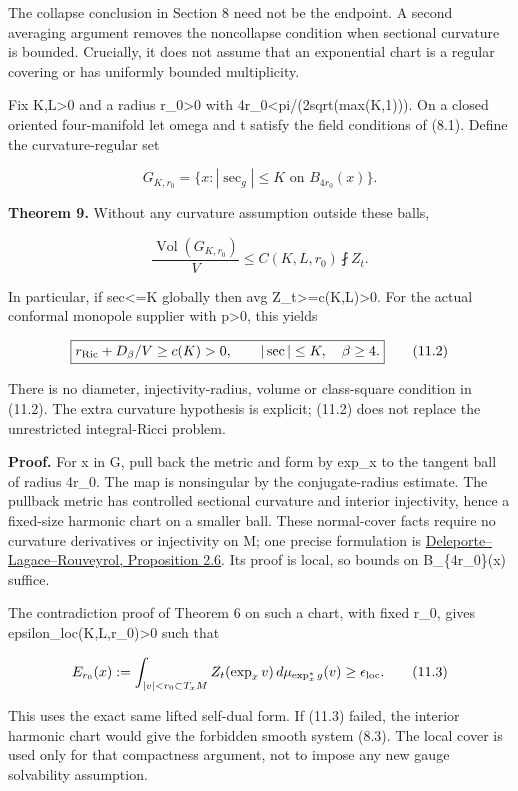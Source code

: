 \documentclass[
  10pt,
]{article}
\begin{document}
The collapse conclusion in Section 8 need not be the endpoint. A second
averaging argument removes the noncollapse condition when sectional
curvature is bounded. Crucially, it does not assume that an exponential
chart is a regular covering or has uniformly bounded multiplicity.

Fix K,L\textgreater0 and a radius r\_0\textgreater0 with
4r\_0\textless pi/(2sqrt(max(K,1))). On a closed oriented four-manifold
let omega and t satisfy the field conditions of (8.1). Define the
curvature-regular set

\[
 G_{K,r_0}=\{x: |\sec_g|\le K\text{ on }B_{4r_0}(x)\}.
\]

\textbf{Theorem 9.} Without any curvature assumption outside these
balls,

\[
 \boxed{\frac{\operatorname{Vol}(G_{K,r_0})}{V}
                   \le C(K,L,r_0)\fint Z_t.}           \tag{11.1}
\]

In particular, if \textbar sec\textbar\textless=K globally then avg
Z\_t\textgreater=c(K,L)\textgreater0. For the actual conformal monopole
supplier with p\textgreater0, this yields

\[
 \boxed{r_{\rm Ric}+D_\beta/V\ge c(K)>0,
                 \qquad |\sec|\le K,\quad\beta\ge4.}  \tag{11.2}
\]

There is no diameter, injectivity-radius, volume or class-square
condition in (11.2). The extra curvature hypothesis is explicit; (11.2)
does not replace the unrestricted integral-Ricci problem.

\textbf{Proof.} For x in G, pull back the metric and form by exp\_x to
the tangent ball of radius 4r\_0. The map is nonsingular by the
conjugate-radius estimate. The pullback metric has controlled sectional
curvature and interior injectivity, hence a fixed-size harmonic chart on
a smaller ball. These normal-cover facts require no curvature
derivatives or injectivity on M; one precise formulation is
\href{https://arxiv.org/html/2601.16176v1\#S2.SS3}{Deleporte--Lagace--Rouveyrol,
Proposition 2.6}. Its proof is local, so bounds on B\_\{4r\_0\}(x)
suffice.

The contradiction proof of Theorem 6 on such a chart, with fixed r\_0,
gives epsilon\_loc(K,L,r\_0)\textgreater0 such that

\[
 E_{r_0}(x):=\int_{|v|<r_0\subset T_xM}
                Z_t(\exp_xv)\,d\mu_{\exp_x^*g}(v)
                              \ge\epsilon_{\rm loc}. \tag{11.3}
\]

This uses the exact same lifted self-dual form. If (11.3) failed, the
interior harmonic chart would give the forbidden smooth system (8.3).
The local cover is used only for that compactness argument, not to
impose any new gauge solvability assumption.
\end{document}
